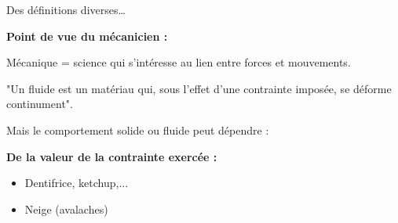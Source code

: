 {%
%
%
%
%
%
%
%
%


\begin{frame}{Des définitions diverses\ldots} 

\small

\textbf{Point de vue du mécanicien :} \bigskip

Mécanique = science qui s'intéresse au lien entre forces et mouvements.

"Un fluide est un matériau qui, sous l'effet d'une contrainte imposée, se déforme continument".

Mais le comportement solide ou fluide peut dépendre :

\medskip

\pause


\textbf{De la valeur de la contrainte exercée :}

\begin{itemize}[<+-| alert@+>]

\item Dentifrice, ketchup,...

\item Neige (avalaches)


\end{itemize}
\end{frame}}
